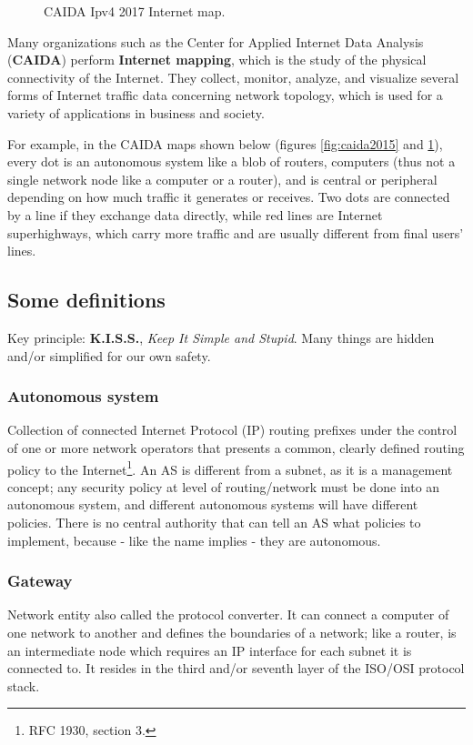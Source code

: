 \begin{figure}[H]
\begin{minipage}[b]{0.4\textwidth}
    \decoRule
    \caption{CAIDA Ipv4 2017 Internet map.}
    \label{fig:caida2017}
  \end{minipage}
\end{figure}

Many organizations such as the Center for Applied Internet Data Analysis (\textbf{CAIDA}) perform \textbf{Internet mapping}, which is the study of the physical connectivity of the Internet. They collect, monitor, analyze, and visualize several forms of Internet traffic data concerning network topology, which is used for a variety of applications in business and society.

For example, in the CAIDA maps shown below (figures \ref{fig:caida2015} and \ref{fig:caida2017}), every dot is an autonomous system like a blob of routers, computers (thus not a single network node like a computer or a router), and is central or peripheral depending on how much traffic it generates or receives. Two dots are connected by a line if they exchange data directly, while red lines are Internet superhighways, which carry more traffic and are usually different from final users' lines.


\subsection{Some definitions}
Key principle: \textbf{K.I.S.S.}, \textit{Keep It Simple and Stupid}. Many things are hidden and/or simplified for our own safety.


\subsubsection*{Autonomous system}
Collection of connected Internet Protocol (IP) routing prefixes under the control of one or more network operators that presents a common, clearly defined routing policy to the Internet\footnote{RFC 1930, section 3.}. An AS is different from a subnet, as it is a management concept; any security policy at level of routing/network must be done into an autonomous system, and different autonomous systems will have different policies. There is no central authority that can tell an AS what policies to implement, because - like the name implies - they are autonomous.


\subsubsection*{Gateway}
Network entity also called the protocol converter. It can connect a computer of one network to another and defines the boundaries of a network; like a router, is an intermediate node which requires an IP interface for each subnet it is connected to. It resides in the third and/or seventh layer of the ISO/OSI protocol stack.

